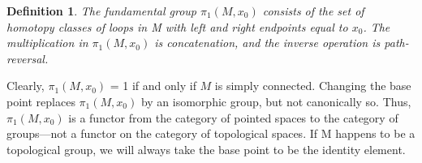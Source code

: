 \documentclass[10pt]{article}
\theoremstyle{plain}
\newtheorem{defi}{Definition}
\begin{document}
\begin{defi}
	The fundamental group $\pi_1(M,x_0)$ consists of the set of homotopy classes of loops in M with left and right endpoints equal to $x_0$. The multiplication in $\pi_1(M,x_0)$ is concatenation, and the inverse operation is path-reversal. 
\end{defi}

Clearly, $\pi_1(M,x_0)$ = 1 if and only if $M$ is simply connected. Changing the base point replaces $\pi_1(M,x_0)$ by an isomorphic group, but not canonically so. Thus, $\pi_1(M,x_0)$ is a functor from the category of pointed spaces to the category of groups—not a functor on the category of topological spaces. If M happens to be a topological group, we will always take the base point to be the identity element.
\end{document}
